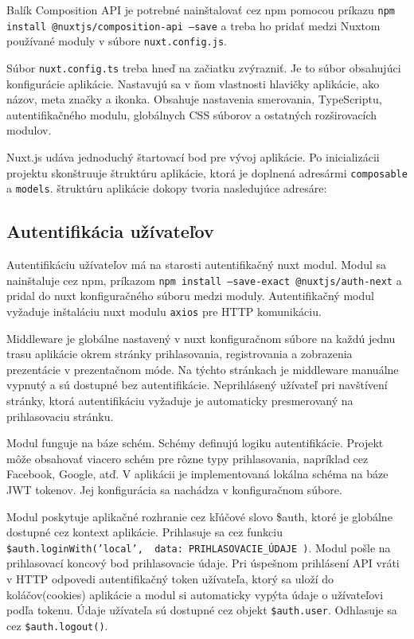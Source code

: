 \vspace{5mm}
Balík Composition API je potrebné nainštalovať cez npm pomocou príkazu \texttt{npm install @nuxtjs/composition-api --save} a treba ho pridať medzi Nuxtom používané moduly v súbore \texttt{nuxt.config.js}.

Súbor \texttt{nuxt.config.ts} treba hneď na začiatku zvýrazniť. Je to súbor obsahujúci konfigurácie aplikácie. Nastavujú sa v ňom vlastnosti hlavičky aplikácie, ako názov, meta značky a ikonka. Obsahuje nastavenia smerovania, TypeScriptu, autentifikačného modulu, globálnych CSS súborov a ostatných rozširovacích modulov.

Nuxt.js udáva jednoduchý štartovací bod pre vývoj aplikácie. Po inicializácii projektu skonštruuje štruktúru aplikácie, ktorá je doplnená adresármi \texttt{composable} a \texttt{models}. štruktúru aplikácie dokopy tvoria nasledujúce adresáre:

\vspace{5mm}
\vspace{5mm}

\subsection{Autentifikácia užívateľov}
Autentifikáciu užívateľov má na starosti autentifikačný nuxt modul. Modul sa nainštaluje cez npm, príkazom \texttt{npm install --save-exact @nuxtjs/auth-next} a pridal do nuxt konfiguračného súboru medzi moduly. Autentifikačný modul vyžaduje inštaláciu nuxt modulu \texttt{axios} pre HTTP komunikáciu. 

Middleware je globálne nastavený v nuxt konfiguračnom súbore na každú jednu trasu aplikácie okrem stránky prihlasovania, registrovania a zobrazenia prezentácie v prezentačnom móde. Na týchto stránkach je middleware manuálne vypnutý a sú dostupné bez autentifikácie. Neprihlásený užívateľ pri navštívení stránky, ktorá autentifikáciu vyžaduje je automaticky presmerovaný na prihlasovaciu stránku.

Modul funguje na báze schém. Schémy definujú logiku autentifikácie. Projekt môže obsahovať viacero schém pre rôzne typy prihlasovania, napríklad cez Facebook, Google, atď. V aplikácii je implementovaná lokálna schéma na báze JWT tokenov. Jej konfigurácia sa nachádza v konfiguračnom súbore. 

Modul poskytuje aplikačné rozhranie cez kľúčové slovo \$auth, ktoré je globálne dostupné cez kontext aplikácie. Prihlasuje sa cez funkciu \texttt{\$auth.loginWith('local', { data: PRIHLASOVACIE\_ÚDAJE })}. Modul pošle na prihlasovací koncový bod prihlasovacie údaje. Pri úspešnom prihlásení API vráti v HTTP odpovedi autentifikačný token užívateľa, ktorý sa uloží do koláčov(cookies) aplikácie a modul si automaticky vypýta údaje o užívateľovi podľa tokenu. Údaje užívateľa sú dostupné cez objekt \texttt{\$auth.user}. Odhlasuje sa cez \texttt{\$auth.logout()}.

